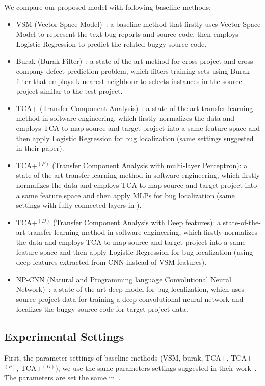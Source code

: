 We compare our proposed model \TRANPCNN with following baseline methods:
\begin{itemize}
  \item VSM (Vector Space Model)~\cite{rao2011retrieval}: a baseline method that firstly uses Vector Space Model to represent the text bug reports and source code, then employs Logistic Regression to predict the related buggy source code.
  \item Burak (Burak Filter)~\cite{peters2013better}: a state-of-the-art method for cross-project and cross-company defect prediction problem, which filters training sets using Burak filter that employs k-nearest neighbour to selects instances in the source project similar to the test project.
  \item TCA+ (Transfer Component Analysis)~\cite{NamPK13}: a state-of-the-art transfer learning method in software engineering, which firstly normalizes the data and employs TCA to map source and target project into a same feature space and then apply Logistic Regression for bug localization (same settings suggested in their paper). 
  \item TCA+$^{(P)}$ (Transfer Component Analysis with multi-layer Perceptron): a state-of-the-art transfer learning method in software engineering, which firstly normalizes the data and employs TCA to map source and target project into a same feature space and then apply MLPs for bug localization (same settings with fully-connected layers in \TRANPCNN).
   \item TCA+$^{(D)}$ (Transfer Component Analysis with Deep features): a state-of-the-art transfer learning method in software engineering, which firstly normalizes the data and employs TCA to map source and target project into a same feature space and then apply Logistic Regression for bug localization (using deep features extracted from CNN instead of VSM features).
  \item NP-CNN (Natural and Programming language Convolutional Neural Network)~\cite{huo2016learning}: a state-of-the-art deep model for bug localization, which uses source project data for training a deep convolutional neural network and localizes the buggy source code for target project data.
\end{itemize}

\subsection{Experimental Settings}
First, the parameter settings of baseline methods (VSM, burak, TCA+, TCA+$^{(P)}$, TCA+$^{(D)}$), we use the same parameters settings suggested in their work~\cite{rao2011retrieval}\cite{NamPK13}. The parameters are set the same in~\cite{huo2016learning}. 

